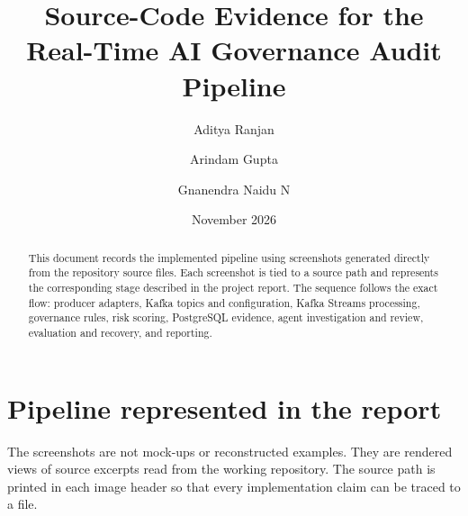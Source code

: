 \documentclass[12pt]{article}
\title{Source-Code Evidence for the Real-Time AI Governance Audit Pipeline}
\author{Aditya Ranjan \and Arindam Gupta \and Gnanendra Naidu N}
\date{November 2026}
\begin{document}
\maketitle
\thispagestyle{empty}

\begin{abstract}
This document records the implemented pipeline using screenshots generated directly from the repository source files. Each screenshot is tied to a source path and represents the corresponding stage described in the project report. The sequence follows the exact flow: producer adapters, Kafka topics and configuration, Kafka Streams processing, governance rules, risk scoring, PostgreSQL evidence, agent investigation and review, evaluation and recovery, and reporting.
\end{abstract}

\section*{Pipeline represented in the report}
\begin{center}
\end{center}

The screenshots are not mock-ups or reconstructed examples. They are rendered views of source excerpts read from the working repository. The source path is printed in each image header so that every implementation claim can be traced to a file.
\end{document}
